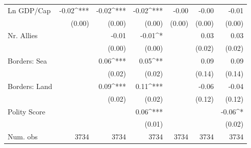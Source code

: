 \begin{table}
\begin{center}
{\begin{tabular}{l D{.}{.}{4.5} D{.}{.}{4.5} D{.}{.}{4.5} D{.}{.}{4.3} D{.}{.}{4.3} D{.}{.}{4.3}}
Ln GDP/Cap               & -0.02^{***}                & -0.02^{***}                 & -0.02^{***}                 & -0.00                      & -0.00                       & -0.01                       \\
                         & (0.00)                     & (0.00)                      & (0.00)                      & (0.00)                     & (0.00)                      & (0.00)                      \\
Nr. Allies               &                            & -0.01                       & -0.01^{*}                   &                            & 0.03                        & 0.03                        \\
                         &                            & (0.00)                      & (0.00)                      &                            & (0.02)                      & (0.02)                      \\
Borders: Sea             &                            & 0.06^{***}                  & 0.05^{**}                   &                            & 0.09                        & 0.09                        \\
                         &                            & (0.02)                      & (0.02)                      &                            & (0.14)                      & (0.14)                      \\
Borders: Land            &                            & 0.09^{***}                  & 0.11^{***}                  &                            & -0.06                       & -0.04                       \\
                         &                            & (0.02)                      & (0.02)                      &                            & (0.12)                      & (0.12)                      \\
Polity Score             &                            &                             & 0.06^{***}                  &                            &                             & -0.06^{*}                   \\
                         &                            &                             & (0.01)                      &                            &                             & (0.02)                      \\
\midrule
Num. obs                 & 3734                       & 3734                        & 3734                        & 3734                       & 3734                        & 3734                        \\

\end{tabular}}
\end{center}
\end{table}
